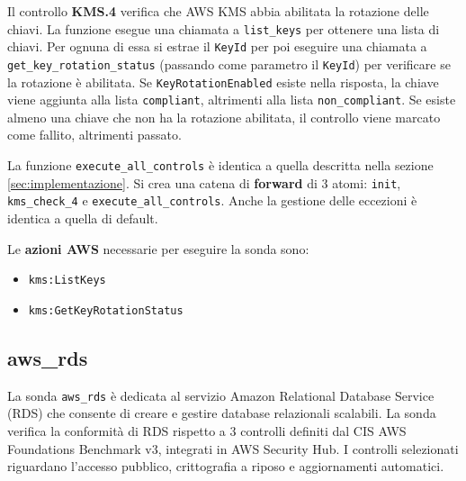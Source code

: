 Il controllo \textbf{KMS.4} verifica che AWS KMS abbia abilitata la rotazione delle chiavi. La funzione esegue una chiamata a \texttt{list\_keys} per ottenere una lista di chiavi. Per ognuna di essa si estrae il \texttt{KeyId} per poi eseguire una chiamata a \texttt{get\_key\_rotation\_status} (passando come parametro il \texttt{KeyId}) per verificare se la rotazione è abilitata. Se \texttt{KeyRotationEnabled} esiste nella risposta, la chiave viene aggiunta alla lista \texttt{compliant}, altrimenti alla lista \texttt{non\_compliant}. Se esiste almeno una chiave che non ha la rotazione abilitata, il controllo viene marcato come fallito, altrimenti passato.

La funzione \texttt{execute\_all\_controls} è identica a quella descritta nella sezione \ref{sec:implementazione}. Si crea una catena di \textbf{forward} di 3 atomi: \texttt{init}, \texttt{kms\_check\_4} e \texttt{execute\_all\_controls}. Anche la gestione delle eccezioni è identica a quella di default.

Le \textbf{azioni AWS} necessarie per eseguire la sonda sono:
\begin{itemize}
    \item \texttt{kms:ListKeys}
    \item \texttt{kms:GetKeyRotationStatus}
\end{itemize}

\subsection{aws\_rds}
\label{sec:rds}

La sonda \texttt{aws\_rds} è dedicata al servizio Amazon Relational Database Service (RDS) che consente di creare e gestire database relazionali scalabili. La sonda verifica la conformità di RDS rispetto a 3  controlli definiti dal CIS AWS Foundations Benchmark v3, integrati in AWS Security Hub. I controlli selezionati riguardano l'accesso pubblico, crittografia a riposo e aggiornamenti automatici.


